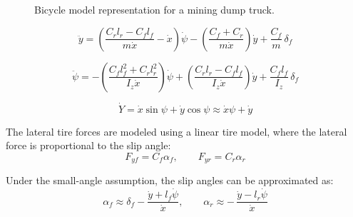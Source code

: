 \documentclass{ifacconf}
\begin{document}
\begin{figure}[htbp]
\caption{Bicycle model representation for a mining dump truck.}
\label{fig:bicycle_model_dump_truck}
\end{figure}



\begin{equation}
\ddot{y}
=
\left(
\frac{C_r l_r - C_f l_f}{m \dot{x}}
-
\dot{x}
\right)\dot{\psi}
-
\left(
\frac{C_f + C_r}{m \dot{x}}
\right)\dot{y}
+
\frac{C_f}{m}\,\delta_f
\end{equation}

\begin{equation}
\ddot{\psi}
=
-
\left(
\frac{C_f l_f^2 + C_r l_r^2}{I_z \dot{x}}
\right)\dot{\psi}
+
\left(
\frac{C_r l_r - C_f l_f}{I_z \dot{x}}
\right)\dot{y}
+
\frac{C_f l_f}{I_z}\,\delta_f
\end{equation}

\begin{equation}
\dot{Y}
=
\dot{x} \sin\psi + \dot{y}\cos\psi
\approx
\dot{x}\psi + \dot{y}
\end{equation}

The lateral tire forces are modeled using a linear tire model, where the lateral force is proportional to the slip angle:
\begin{equation}
F_{yf} = C_f \alpha_f, \qquad F_{yr} = C_r \alpha_r
\end{equation}

Under the small-angle assumption, the slip angles can be approximated as:
\begin{equation}
\alpha_f \approx \delta_f - \frac{\dot{y} + l_f \dot{\psi}}{\dot{x}},
\qquad
\alpha_r \approx -\,\frac{\dot{y} - l_r \dot{\psi}}{\dot{x}}
\end{equation}
\end{document}
